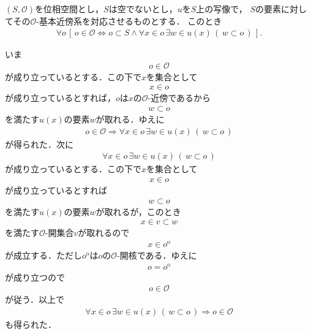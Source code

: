 	\begin{screen}
		\begin{thm}[基本近傍系による開集合の特徴づけ]
		\label{thm:local_base_defines_open_sets}
			$(S,\mathscr{O})$を位相空間とし，$S$は空でないとし，$u$を$S$上の写像で，
			$S$の要素に対してその$\mathscr{O}$-基本近傍系を対応させるものとする．
			このとき
			\begin{align}
				\forall o\, \left[\, o \in \mathscr{O} \Longleftrightarrow
				o \subset S \wedge \forall x \in o\, \exists w \in u(x)\, (\, w \subset o\, )\, \right].
			\end{align}
		\end{thm}
	\end{screen}
	
	\begin{sketch}
		いま
		\begin{align}
			o \in \mathscr{O}
		\end{align}
		が成り立っているとする．この下で$x$を集合として
		\begin{align}
			x \in o
		\end{align}
		が成り立っているとすれば，$o$は$x$の$\mathscr{O}$-近傍であるから
		\begin{align}
			w \subset o
		\end{align}
		を満たす$u(x)$の要素$w$が取れる．ゆえに
		\begin{align}
			o \in \mathscr{O} \Longrightarrow
			\forall x \in o\, \exists w \in u(x)\, (\, w \subset o\, )
		\end{align}
		が得られた．次に
		\begin{align}
			\forall x \in o\, \exists w \in u(x)\, (\, w \subset o\, )
		\end{align}
		が成り立っているとする．この下で$x$を集合として
		\begin{align}
			x \in o
		\end{align}
		が成り立っているとすれば
		\begin{align}
			w \subset o
		\end{align}
		を満たす$u(x)$の要素$w$が取れるが，このとき
		\begin{align}
			x \in v \subset w
		\end{align}
		を満たす$\mathscr{O}$-開集合$v$が取れるので
		\begin{align}
			x \in o^{\mathrm{o}}
		\end{align}
		が成立する．ただし$o^{\mathrm{o}}$は$o$の$\mathscr{O}$-開核である．ゆえに
		\begin{align}
			o = o^{\mathrm{o}}
		\end{align}
		が成り立つので
		\begin{align}
			o \in \mathscr{O}
		\end{align}
		が従う．以上で
		\begin{align}
			\forall x \in o\, \exists w \in u(x)\, (\, w \subset o\, )
			\Longrightarrow o \in \mathscr{O}
		\end{align}
		も得られた．
		\QED
	\end{sketch}
	
